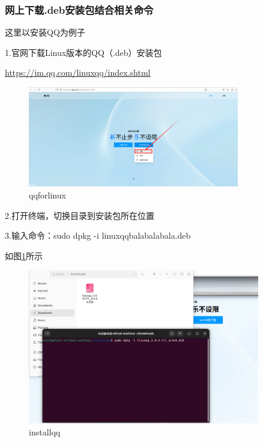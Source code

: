 \documentclass[12pt]{article}
\begin{document}
\subsubsection{网上下载.deb安装包结合相关命令}

这里以安装QQ为例子

1.官网下载Linux版本的QQ（.deb）安装包

\href{https://im.qq.com/linuxqq/index.shtml}{https://im.qq.com/linuxqq/index.shtml}

\begin{figure}[hbt!]
    \centering
    \includegraphics[width=0.82\textwidth]{img/qqforlinux.png}
    \caption{qqforlinux}
\end{figure}

2.打开终端，切换目录到安装包所在位置

3.输入命令：sudo dpkg -i linuxqqbalabalabala.deb

如图\ref{installforqq}所示

\begin{figure}[hbt!]
    \centering
    \includegraphics[width=0.9\textwidth]{img/installforqq.png}
    \caption{installqq}
    \label{installforqq}
\end{figure}
\end{document}

